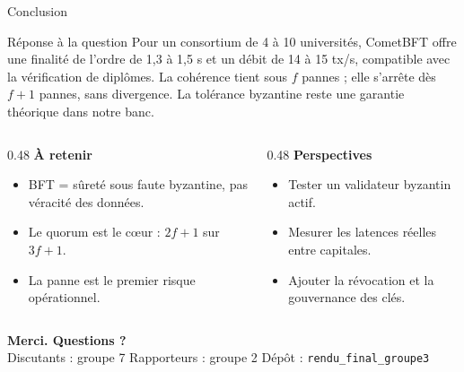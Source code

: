 \documentclass[10pt,aspectratio=169]{beamer}
\begin{document}
\begin{frame}{Conclusion}
  \begin{block}{Réponse à la question}
    \small
    Pour un consortium de 4 à 10 universités, CometBFT offre une finalité de
    l'ordre de 1,3 à 1,5 s et un débit de 14 à 15 tx/s, compatible avec la
    vérification de diplômes. La cohérence tient sous $f$ pannes ; elle s'arrête
    dès $f+1$ pannes, sans divergence. La tolérance byzantine reste une garantie
    théorique dans notre banc.
  \end{block}
  \begin{columns}[T,onlytextwidth]
    \begin{column}{0.48\textwidth}
      \small
      \textbf{À retenir}
      \begin{itemize}
        \item BFT = sûreté sous faute byzantine, pas véracité des données.
        \item Le quorum est le cœur : $2f+1$ sur $3f+1$.
        \item La panne est le premier risque opérationnel.
      \end{itemize}
    \end{column}
    \begin{column}{0.48\textwidth}
      \small
      \textbf{Perspectives}
      \begin{itemize}
        \item Tester un validateur byzantin actif.
        \item Mesurer les latences réelles entre capitales.
        \item Ajouter la révocation et la gouvernance des clés.
      \end{itemize}
    \end{column}
  \end{columns}
  \vspace{0.25cm}
  \centering
  \textbf{Merci. Questions ?}\\[0.1cm]
  \footnotesize
  Discutants : groupe 7 \quad\textbullet\quad Rapporteurs : groupe 2 \quad\textbullet\quad Dépôt : \texttt{rendu\_final\_groupe3}
\end{frame}
\end{document}
